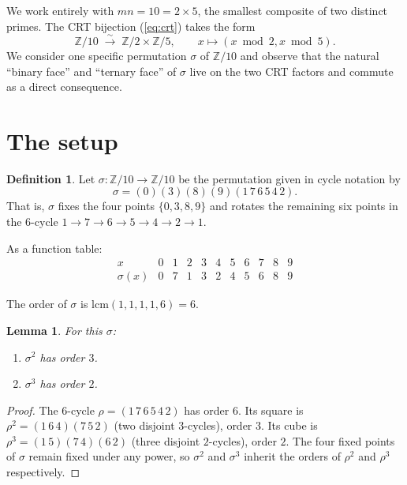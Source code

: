 \documentclass[11pt]{article}
\theoremstyle{plain}
\newtheorem{lemma}[theorem]{Lemma}
\theoremstyle{definition}
\newtheorem{definition}[theorem]{Definition}
\theoremstyle{remark}
\begin{document}
We work entirely with $mn = 10 = 2 \times 5$, the smallest composite of two distinct primes. The CRT bijection (\ref{eq:crt}) takes the form
\[
\mathbb{Z}/10 \;\overset{\sim}{\longrightarrow}\; \mathbb{Z}/2 \times \mathbb{Z}/5,
\qquad x \mapsto (x \bmod 2, x \bmod 5).
\]
We consider one specific permutation $\sigma$ of $\mathbb{Z}/10$ and observe that the natural ``binary face'' and ``ternary face'' of $\sigma$ live on the two CRT factors and commute as a direct consequence.

\section{The setup}

\begin{definition}\label{def:sigma}
Let $\sigma : \mathbb{Z}/10 \to \mathbb{Z}/10$ be the permutation given in cycle notation by
\[
\sigma = (0)(3)(8)(9)(1\,7\,6\,5\,4\,2).
\]
That is, $\sigma$ fixes the four points $\{0, 3, 8, 9\}$ and rotates the remaining six points in the $6$-cycle $1 \to 7 \to 6 \to 5 \to 4 \to 2 \to 1$.
\end{definition}

As a function table:
\[
\begin{array}{c|cccccccccc}
x & 0 & 1 & 2 & 3 & 4 & 5 & 6 & 7 & 8 & 9 \\
\hline
\sigma(x) & 0 & 7 & 1 & 3 & 2 & 4 & 5 & 6 & 8 & 9
\end{array}
\]

The order of $\sigma$ is $\text{lcm}(1, 1, 1, 1, 6) = 6$.

\begin{lemma}\label{lem:powers}
For this $\sigma$:
\begin{enumerate}[label=(\alph*)]
\item $\sigma^2$ has order $3$.
\item $\sigma^3$ has order $2$.
\end{enumerate}
\end{lemma}

\begin{proof}
The $6$-cycle $\rho = (1\,7\,6\,5\,4\,2)$ has order $6$. Its square is $\rho^2 = (1\,6\,4)(7\,5\,2)$ (two disjoint $3$-cycles), order $3$. Its cube is $\rho^3 = (1\,5)(7\,4)(6\,2)$ (three disjoint $2$-cycles), order $2$. The four fixed points of $\sigma$ remain fixed under any power, so $\sigma^2$ and $\sigma^3$ inherit the orders of $\rho^2$ and $\rho^3$ respectively.
\end{proof}
\end{document}
